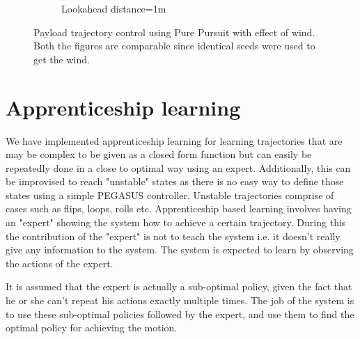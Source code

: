 \documentclass[hidelinks,BTech]{iitmdiss}
\begin{document}
\begin{figure}[H]
\begin{subfigure}[t]{0.48\textwidth}
      \caption{Lookahead distance=1m}
  \end{subfigure}
  \caption{Payload trajectory control using Pure Pursuit with effect of wind. Both the figures are comparable since identical seeds were used to get the wind.}
\end{figure}	

\chapter{Apprenticeship learning}
We have implemented apprenticeship learning for learning trajectories that are may be complex to be given as a closed form function but can easily be repeatedly done in a close to optimal way using an expert. Additionally, this can be improvised to reach "unstable" states as there is no easy way to define those states using a simple PEGASUS controller. Unstable trajectories comprise of cases such as flips, loops, rolls etc. Apprenticeship based learning involves having an "expert" showing the system how to achieve a certain trajectory. During this the contribution of the "expert" is not to teach the system i.e. it doesn't really give any information to the system. The system is expected to learn by observing the actions of the expert. 
 
 It is assumed that the expert is actually a sub-optimal policy, given the fact that he or she can't repeat his actions exactly multiple times. The job of the system is to use these sub-optimal policies followed by the expert, and use them to find the optimal policy for achieving the motion.
\end{document}
